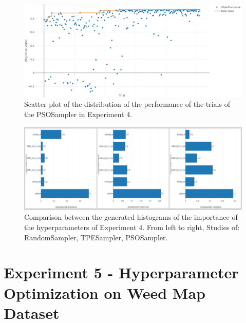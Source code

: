 \begin{figure}[H]
    \begin{minipage}{\textwidth}
        \centering
        \includegraphics[width=13.8cm]{figures/figure-4.4.4.png}
        \caption[Trials Performance Distribution of PSOSampler - Experiment 4]{Scatter plot of the distribution of the performance of the trials of the PSOSampler in Experiment 4.}
        \label{fig:figure-4.4.4}
    \end{minipage}
\end{figure}
\begin{figure}[t]
	\centering
	\includegraphics[width=15cm]{figures/figure-4.4.1.png}
	\caption[Hyperparameters Importance Histograms Experiment 4]{Comparison between the generated histograms of the importance of the hyperparameters of Experiment 4. From left to right, Studies of: RandomSampler, TPESampler, PSOSampler.}
	\label{fig:figure-4.4.1}
\end{figure}

\section{Experiment 5 - Hyperparameter Optimization on Weed Map Dataset}

